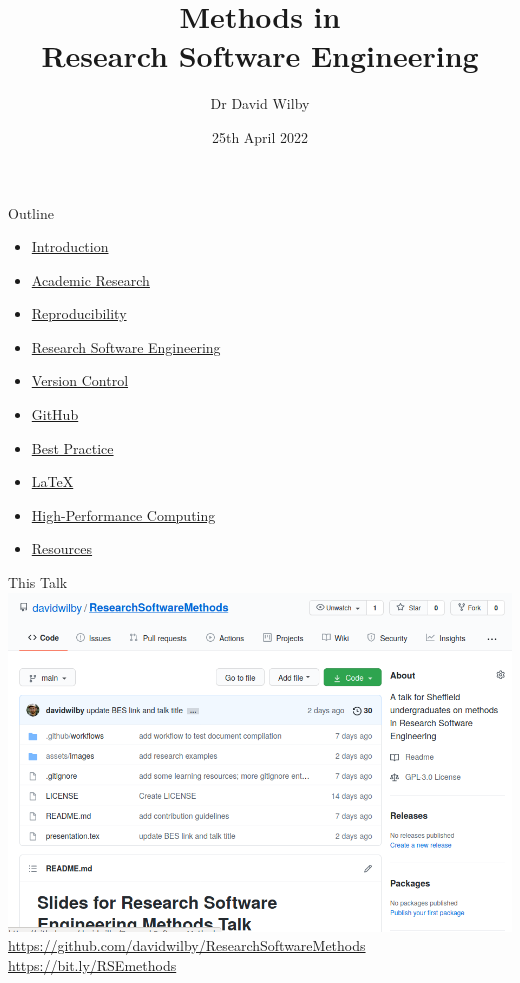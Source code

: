\documentclass{beamer} %
\title{Methods in \\Research Software Engineering}
\date{25th April 2022}
\author{Dr David Wilby}
\institute{\href{https://rse.shef.ac.uk}{Research Software Engineering Team},\\ The University of Sheffield}
\begin{document}
  \begin{frame}
    \titlepage
  \end{frame}

  \begin{frame}{Outline}
    \begin{itemize}
      \item \hyperlink{INTRO}{Introduction}
      \item \hyperlink{RESEARCH}{Academic Research}
      \item \hyperlink{REPRO}{Reproducibility}
      \item \hyperlink{RSE}{Research Software Engineering}
      \item \hyperlink{GIT}{Version Control}
      \item \hyperlink{GITHUB}{GitHub}
      \item \hyperlink{BESTPRAC}{Best Practice}
      \item \hyperlink{LATEX}{LaTeX}
      \item \hyperlink{HPC}{High-Performance Computing}
      \item \hyperlink{RESOURCES}{Resources}
    \end{itemize}
  \end{frame}

  \begin{frame}[label=INTRO]{This Talk}
    \href{https://github.com/davidwilby/ResearchSoftwareMethods}{\includegraphics[width=\textwidth]{talk_repo_screenshot.png}}
    \url{https://github.com/davidwilby/ResearchSoftwareMethods}
    \url{https://bit.ly/RSEmethods}
  \end{frame}
\end{document}
